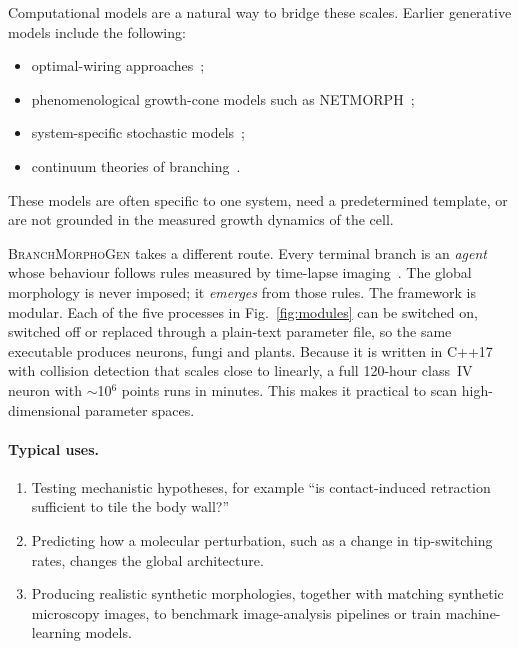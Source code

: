 \documentclass[11pt,a4paper]{article}
\begin{document}
Computational models are a natural way to bridge these scales. Earlier generative models include the following:
\begin{itemize}
  \item optimal-wiring approaches~\cite{Cuntz2010};
  \item phenomenological growth-cone models such as NETMORPH~\cite{Koene2009};
  \item system-specific stochastic models~\cite{Palavalli2021,Castro2020,Ganguly2016};
  \item continuum theories of branching~\cite{Hannezo2017,Uar2021}.
\end{itemize}
These models are often specific to one system, need a predetermined template, or are not grounded in the measured growth dynamics of the cell.

\textsc{BranchMorphoGen} takes a different route. Every terminal branch is an \emph{agent} whose behaviour follows rules measured by time-lapse imaging~\cite{Shree2022,Ouyang2025}. The global morphology is never imposed; it \emph{emerges} from those rules. The framework is modular. Each of the five processes in Fig.~\ref{fig:modules} can be switched on, switched off or replaced through a plain-text parameter file, so the same executable produces neurons, fungi and plants. Because it is written in C++17 with collision detection that scales close to linearly, a full 120-hour class~IV neuron with $\sim$10$^6$ points runs in minutes. This makes it practical to scan high-dimensional parameter spaces.

\paragraph{Typical uses.}
\begin{enumerate}
  \item Testing mechanistic hypotheses, for example ``is contact-induced retraction sufficient to tile the body wall?''
  \item Predicting how a molecular perturbation, such as a change in tip-switching rates, changes the global architecture.
  \item Producing realistic synthetic morphologies, together with matching synthetic microscopy images, to benchmark image-analysis pipelines or train machine-learning models.
\end{enumerate}
\end{document}
